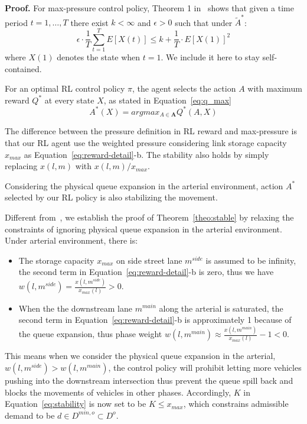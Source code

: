 \textbf{Proof.}  For max-pressure control policy, Theorem 1 in~\cite{MP13} shows that given a time period $t=1,\ldots,T$ there exist $k<\infty$ and $\epsilon>0$ such that under $\tilde{A}^*$:
\begin{equation}
\label{eq:stability-proof}
\epsilon\cdot\frac{1}{T}\sum_{t=1}^TE[X(t)]\leq k + \frac{1}{T}\cdot E[X(1)]^2
\end{equation}
where $X(1)$ denotes the state when $t=1$. We include it here to stay self-contained.

For an optimal RL control policy $\pi$, the agent selects the action $A$ with maximum reward $Q^*$ at every state $X$, as stated in Equation~\ref{eq:q_max}
\begin{equation}
A^*(X) = argmax_{A\in \pmb{A}}Q^*(A, X)
\end{equation}

The difference between the pressure definition in RL reward and max-pressure is that our RL agent use the weighted pressure considering link storage capacity $x_{max}$ as Equation~\ref{eq:reward-detail}-b. The stability also holds by simply replacing $x(l,m)$ with $x(l,m)/x_{max}$.

\begin{theorem}
\label{theo:stable} Considering the physical queue expansion in the arterial environment, action $A^*$ selected by our RL policy is also stabilizing the movement.
\end{theorem}

Different from~\cite{MP13}, we establish the proof of Theorem~\ref{theo:stable} by relaxing the constraints of ignoring physical queue expansion in the arterial environment. Under arterial environment, there is:
\begin{itemize}
    \item The storage capacity $x_{max}$ on side street lane $m^{side}$ is assumed to be infinity, the second term in Equation~\ref{eq:reward-detail}-b is zero, thus we have $w(l,m^{side})=\frac{x(l,m^{side})}{x_{max}(l)}>0$.
    \item When the the downstream lane $m^{main}$ along the arterial is saturated, the second term in Equation~\ref{eq:reward-detail}-b is approximately 1 because of the queue expansion, thus phase weight $w(l,m^{main})\approx \frac{x(l,m^{main})}{x_{max}(l)} -1 < 0$. 
\end{itemize}

This means when we consider the physical queue expansion in the arterial, $w(l,m^{side}) > w(l,m^{main})$, the control policy will prohibit letting more vehicles pushing into the downstream intersection thus prevent the queue spill back and blocks the movements of vehicles in other phases. Accordingly, $K$ in Equation~\ref{eq:stability} is now set to be $K\leq x_{max}$, which constrains admissible demand to be $d\in D^{min,o} \subset D^o$. 


